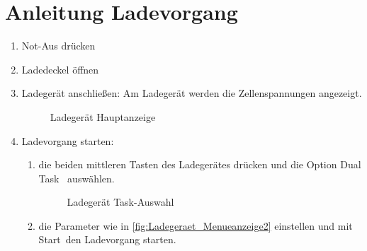 \clearpage
\section{Anleitung Ladevorgang\label{sec:Anleitung_Laden}}
\begin{enumerate}
    \item Not-Aus drücken
    \item Ladedeckel öffnen
    \item Ladegerät anschließen: Am Ladegerät werden die Zellenspannungen angezeigt.
    \begin{figure}[H]
        \centering
        \caption{Ladegerät Hauptanzeige \label{fig:Ladegeraet_Hauptanzeige}}
    \end{figure}
    \newpage
    \item Ladevorgang starten:
    \begin{enumerate}
        \item die beiden mittleren Tasten des Ladegerätes drücken und die Option \glqq Dual Task \grqq\ auswählen.
        \begin{figure}[H]
            \centering
            \caption{Ladegerät Task-Auswahl \label{fig:Ladegeraet_Menueanzeige}}
        \end{figure}
        \item die Parameter wie in \autoref{fig:Ladegeraet_Menueanzeige2} einstellen und mit \glqq Start\grqq\ den Ladevorgang starten.
        \begin{figure}[H]

\end{figure}
\end{enumerate}
\end{enumerate}
